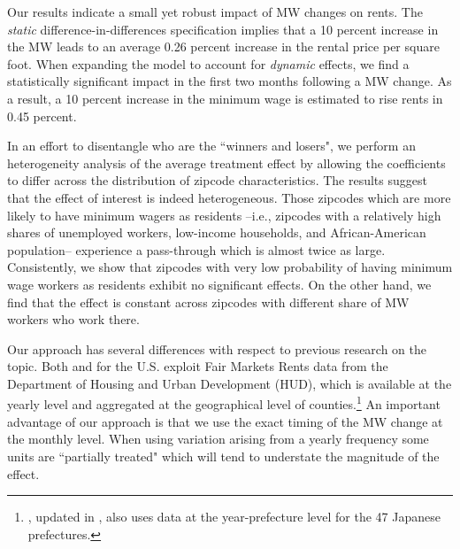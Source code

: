 Our results indicate a small %
 yet robust impact of MW changes on rents. The \textit{static} 
difference-in-differences specification implies that a 10 percent increase in the MW leads to 
an average 0.26 percent increase in the rental price per square foot. When expanding the model 
to account for \textit{dynamic} effects, we find a statistically significant impact in the 
first two months following a MW change. As a result, a 10 percent increase in the minimum 
wage is estimated to rise rents in 0.45 percent. 

In an effort to disentangle who are the ``winners and losers", we perform an heterogeneity 
analysis of the average treatment effect by allowing the coefficients to differ across the 
distribution of zipcode characteristics. The results suggest that the effect of interest is 
indeed heterogeneous. Those zipcodes which are more likely to have minimum wagers as residents 
--i.e., zipcodes with a relatively high shares of unemployed workers, low-income households, 
and African-American population-- experience a pass-through which is almost twice as large. 
Consistently, we show that zipcodes with very low probability of having minimum wage workers 
as residents exhibit no significant effects. On the other hand, we find that the effect is 
constant across zipcodes with different share of MW workers who work there.

Our approach has several differences with respect to previous research on the topic. Both 
\textcite{Tidemann2018} and \textcite{Yamagishi2019} for the U.S. exploit Fair Markets Rents data 
from the Department of Housing and Urban Development (HUD), which is available at the yearly 
level and aggregated at the geographical level of counties.\footnote{\textcite{Yamagishi2019}, 
	updated in \textcite{Yamagishi2020}, also uses data at the year-prefecture level for the 47 
	Japanese prefectures.} 
An important advantage of our approach is that we use the exact timing of the MW change at 
the monthly level. When using variation arising from a yearly frequency some units are 
``partially treated" which will tend to understate the magnitude of the effect. 


